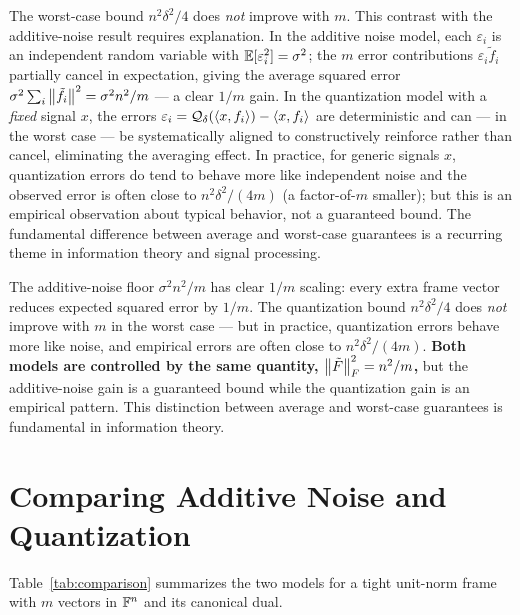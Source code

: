 \begin{remark*}
\label{rmk:quant-vs-noise}
The worst-case bound $n^2\delta^2/4$ does \emph{not} improve with $m$.
This contrast with the additive-noise result requires explanation.
In the additive noise model, each $\varepsilon_i$ is an independent
random variable with $\mathbb{E}[\varepsilon_i^2]=\sigma^2$; the $m$ error
contributions $\varepsilon_i\tilde f_i$ partially cancel in expectation,
giving the average squared error $\sigma^2\sum_i\left\| \tilde f_i \right\|^2=\sigma^2 n^2/m$
--- a clear $1/m$ gain. In the quantization model with a \emph{fixed}
signal $x$, the errors $\varepsilon_i = \mathcal{Q}_\delta(\left\langle x, f_i \right\rangle)
- \left\langle x, f_i \right\rangle$ are deterministic and can --- in the worst case --- be
systematically aligned to constructively reinforce rather than cancel,
eliminating the averaging effect. In practice, for generic signals $x$,
quantization errors do tend to behave more like independent noise and the
observed error is often close to $n^2\delta^2/(4m)$ (a factor-of-$m$
smaller); but this is an empirical observation about typical behavior,
not a guaranteed bound. The fundamental difference between average and
worst-case guarantees is a recurring theme in information theory and
signal processing.
\end{remark*}

\begin{keyidea}
The additive-noise floor $\sigma^2 n^2/m$ has clear $1/m$ scaling:
every extra frame vector reduces expected squared error by $1/m$.
The quantization bound $n^2\delta^2/4$ does \emph{not} improve with
$m$ in the worst case --- but in practice, quantization errors
behave more like noise, and empirical errors are often close to
$n^2\delta^2/(4m)$. \textbf{Both models are controlled by the same
quantity, $\left\| \tilde F \right\|_F^2 = n^2/m$,} but the additive-noise
gain is a guaranteed bound while the quantization gain is an
empirical pattern. This distinction between average and worst-case
guarantees is fundamental in information theory.
\end{keyidea}

\section{Comparing Additive Noise and Quantization}
\label{sec:comparison}

Table~\ref{tab:comparison} summarizes the two models for a tight
unit-norm frame with $m$ vectors in $\mathbb{F}^n$ and its canonical dual.

